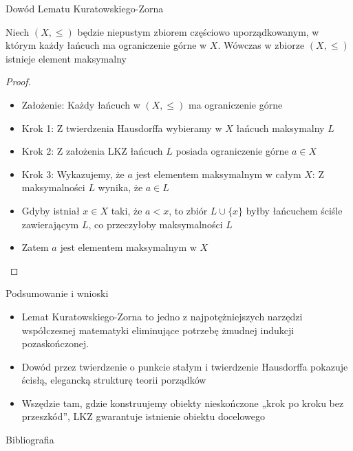 \documentclass[aspectratio=169,11pt,t,envcountsect,professionalfonts]{beamer}
\begin{document}
\begin{frame}{Dowód Lematu Kuratowskiego-Zorna}
    \begin{mythm}
        Niech $(X, \leqslant)$ będzie niepustym zbiorem częściowo uporządkowanym, w którym każdy łańcuch ma ograniczenie górne w $X$. Wówczas w zbiorze $(X, \leqslant)$ istnieje element maksymalny
    \end{mythm}
    \begin{proof}
        \begin{itemize}
            \item Założenie: Każdy łańcuch w $(X, \leqslant)$ ma ograniczenie górne
            \item Krok 1: Z twierdzenia Hausdorffa wybieramy w $X$ łańcuch maksymalny $L$
            \item Krok 2: Z założenia LKZ łańcuch $L$ posiada ograniczenie górne $a \in X$
            \item Krok 3: Wykazujemy, że $a$ jest elementem maksymalnym w całym $X$: Z maksymalności $L$ wynika, że $a \in L$
            \item Gdyby istniał $x \in X$ taki, że $a < x$, to zbiór $L \cup \{x\}$ byłby łańcuchem ściśle zawierającym $L$, co przeczyłoby maksymalności $L$
            \item Zatem $a$ jest elementem maksymalnym w $X$
        \end{itemize}
    \end{proof}
\end{frame}
\begin{frame}{Podsumowanie i wnioski}
\begin{itemize}
    \item Lemat Kuratowskiego-Zorna to jedno z najpotężniejszych narzędzi współczesnej matematyki eliminujące potrzebę żmudnej indukcji pozaskończonej.
    \item Dowód przez twierdzenie o punkcie stałym i twierdzenie Hausdorffa pokazuje ścisłą, elegancką strukturę teorii porządków
    \item Wszędzie tam, gdzie konstruujemy obiekty nieskończone „krok po kroku bez przeszkód”, LKZ gwarantuje istnienie obiektu docelowego
\end{itemize}
    
\end{frame}

\begin{frame}{Bibliografia}

\nocite{*} 

\printbibliography
    
\end{frame}
\end{document}
